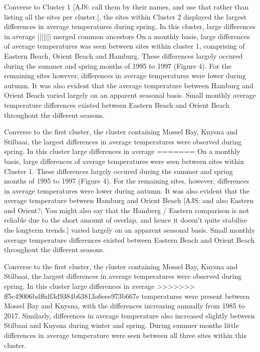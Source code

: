 \documentclass[12pt,A4paper,]{article}
\begin{document}
Converse to Cluster 1 {[}AJS: call them by their names, and use that
rather than listing all the sites per cluster.{]}, the sites within
Cluster 2 displayed the largest differences in average temperatures
during spring. In this cluster, large differences in average
||||||| merged common ancestors
On a monthly basis, large differences of average temperatures was seen
between sites within cluster 1, comprising of Eastern Beach, Orient
Beach and Hamburg. These differences largely occured during the summer
and spring months of 1995 to 1997 (Figure 4). For the remaining sites
however, differences in average temperatures were lower during autumn.
It was also evident that the average temperature between Hamburg and
Orient Beach varied largely on an apparent seasonal basis. Small monthly
average temperature differences existed between Eastern Beach and Orient
Beach throughout the different seasons.

Converse to the first cluster, the cluster containing Mossel Bay, Knysna
and Stilbaai, the largest differences in average temperatures were
observed during spring. In this cluster large differences in average
=======
On a monthly basis, large differences of average temperatures were seen
between sites within Cluster 1. These differences largely occured during
the summer and spring months of 1995 to 1997 (Figure 4). For the
remaining sites, however, differences in average temperatures were lower
during autumn. It was also evident that the average temperature between
Hamburg and Orient Beach {[}AJS: and also Eastern and Orient?; You might
also say that the Hamberg / Eastern comparison is not reliable due to
the short amount of overlap, and hence it doesn't quite stabilise the
longterm trends.{]} varied largely on an apparent seasonal basis. Small
monthly average temperature differences existed between Eastern Beach
and Orient Beach throughout the different seasons.

Converse to the first cluster, the cluster containing Mossel Bay, Knysna
and Stilbaai, the largest differences in average temperatures were
observed during spring. In this cluster large differences in average
>>>>>>> ff5c49006bdf6df3d9384b63813a6eee973b667e
temperatures were present between Mossel Bay and Knysna, with the
differences increasing annually from 1985 to 2017. Similarly,
differences in average temperature also increased slightly between
Stilbaai and Knysna during winter and spring. During summer months
little differences in average temperature were seen between all three
sites within this cluster.
\end{document}
